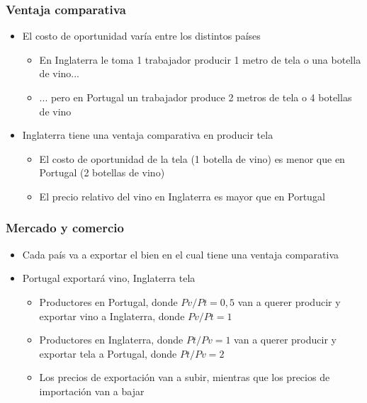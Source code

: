 \documentclass{beamer}
\begin{document}
\begin{frame}
\frametitle{Ventaja comparativa}
\begin{itemize}
    \item El costo de oportunidad varía entre los distintos países\vspace{2mm}
    \begin{itemize}
        \item En Inglaterra le toma 1 trabajador producir 1 metro de tela o una botella de vino...\vspace{2mm}
        \item ... pero en Portugal un trabajador produce 2 metros de tela o 4 botellas de vino\vspace{4mm}
    \end{itemize}
    \item Inglaterra tiene una ventaja comparativa en producir tela
    \begin{itemize}\vspace{2mm}
        \item El costo de oportunidad de la tela (1 botella de vino) es menor que en Portugal (2 botellas de vino)\vspace{2mm}
        \item El precio relativo del vino en Inglaterra es mayor que en Portugal
    \end{itemize}
\end{itemize}
\end{frame}

\begin{frame}
\frametitle{Mercado y comercio}
\begin{itemize}
    \item Cada país va a exportar el bien en el cual tiene una ventaja comparativa\vspace{4mm}
    \item Portugal exportará vino, Inglaterra tela\vspace{2mm}
        \begin{itemize}
        \item Productores en Portugal, donde $Pv/Pt = 0,5$ van a querer producir y exportar vino a Inglaterra, donde $Pv/Pt = 1$\vspace{2mm}
        \item Productores en Inglaterra, donde $Pt/Pv = 1$ van a querer producir y exportar tela a Portugal, donde $Pt/Pv = 2$\vspace{2mm}
        \item Los precios de exportación van a subir, mientras que los precios de importación van a bajar
        \end{itemize}
\end{itemize}
\end{frame}
\end{document}
